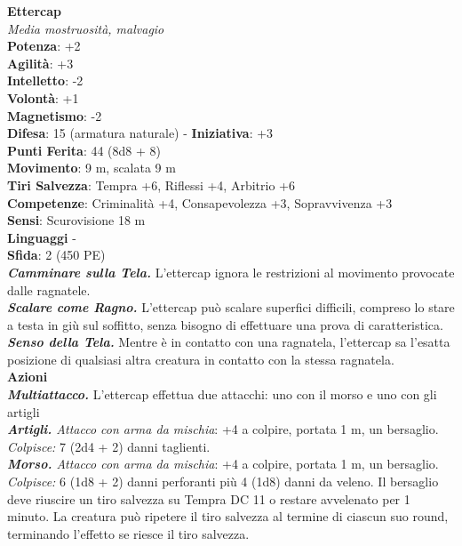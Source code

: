 \begin{multicols}{2}
\medskip\textbf{Ettercap}\\
\emph{Media mostruosità, malvagio}\\
\textbf{Potenza}: +2\\
\textbf{Agilità}: +3\\
\textbf{Intelletto}: -2\\
\textbf{Volontà}: +1\\
\textbf{Magnetismo}: -2\\
\textbf{Difesa}: 15 (armatura naturale) - \textbf{Iniziativa}: +3\\
\textbf{Punti Ferita}: 44 (8d8 + 8)\\
\textbf{Movimento}: 9 m, scalata 9 m\\
\textbf{Tiri Salvezza}: Tempra +6, Riflessi +4, Arbitrio +6\\
\textbf{Competenze}: Criminalità +4, Consapevolezza +3, Sopravvivenza +3\\
\textbf{Sensi}: Scurovisione 18 m\\
\textbf{Linguaggi} -\\
\textbf{Sfida}: 2 (450 PE)\smallskip\\
\emph{\textbf{Camminare sulla Tela.}} L'ettercap ignora le restrizioni al movimento provocate dalle ragnatele.\\
\emph{\textbf{Scalare come Ragno.}} L'ettercap può scalare superfici difficili, compreso lo stare a testa in giù sul soffitto, senza bisogno di effettuare una prova di caratteristica.\\
\emph{\textbf{Senso della Tela.}} Mentre è in contatto con una ragnatela, l'ettercap sa l'esatta posizione di qualsiasi altra creatura in contatto con la stessa ragnatela.\\
\smallskip\textbf{Azioni}\\
\emph{\textbf{Multiattacco.}} L'ettercap effettua due attacchi: uno con il morso e uno con gli artigli\\
\emph{\textbf{Artigli.} Attacco con arma da mischia}: +4 a colpire, portata 1 m, un bersaglio.\\
\emph{Colpisce:} 7 (2d4 + 2) danni taglienti.\\
\emph{\textbf{Morso.} Attacco con arma da mischia}: +4 a colpire, portata 1 m, un bersaglio.\\
\emph{Colpisce:} 6 (1d8 + 2) danni perforanti più 4 (1d8) danni da veleno. Il bersaglio deve riuscire un tiro salvezza su Tempra DC 11 o restare avvelenato per 1 minuto. La creatura può ripetere il tiro salvezza al termine di ciascun suo round, terminando l'effetto se riesce il tiro salvezza.\\

\end{multicols}
